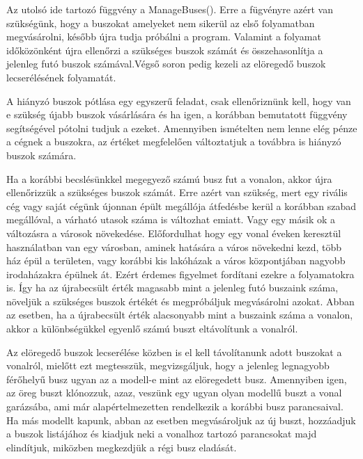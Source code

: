 Az utolsó ide tartozó függvény a ManageBuses(). Erre a fügvényre azért van szükségünk, hogy a buszokat amelyeket nem sikerül az első folyamatban megvásárolni, később újra tudja próbálni a program. Valamint a folyamat időközönként újra ellenőrzi a szükséges buszok számát és összehasonlítja a jelenleg futó buszok számával.Végső soron pedig kezeli az elöregedő buszok lecserélésének folyamatát.

A hiányzó buszok pótlása egy egyszerű feladat, csak ellenőriznünk kell, hogy van e szükség újabb buszok vásárlására és ha igen, a korábban bemutatott függvény segítségével pótolni tudjuk a ezeket. Amennyiben ismételten nem lenne elég pénze a cégnek a buszokra, az értéket megfelelően változtatjuk a továbbra is hiányzó buszok számára.

Ha a korábbi becslésünkkel megegyező számú busz fut a vonalon, akkor újra ellenőrizzük a szükséges buszok számát. Erre azért van szükség, mert egy rivális cég vagy saját cégünk újonnan épült megállója átfedésbe kerül a korábban szabad megállóval, a várható utasok száma is változhat emiatt. Vagy egy másik ok a változásra a városok növekedése. Előfordulhat hogy egy vonal éveken keresztül használatban van egy városban, aminek hatására a város növekedni kezd, több ház épül a területen, vagy korábbi kis lakóházak a város központjában nagyobb irodaházakra épülnek át. Ezért érdemes figyelmet fordítani ezekre a folyamatokra is. Így ha az újrabecsült érték magasabb mint a jelenleg futó buszaink száma, növeljük a szükséges buszok értékét és megpróbáljuk megvásárolni azokat. Abban az esetben, ha a újrabecsült érték alacsonyabb mint a buszaink száma a vonalon, akkor a különbségükkel egyenlő számú buszt eltávolítunk a vonalról.

Az elöregedő buszok lecserélése közben is el kell távolítanunk adott buszokat a vonalról, mielőtt ezt megtesszük, megvizsgáljuk, hogy a jelenleg legnagyobb férőhelyű busz ugyan az a modell-e mint az elöregedett busz. Amennyiben igen, az öreg buszt klónozzuk, azaz, veszünk egy ugyan olyan modellű buszt a vonal garázsába, ami már alapértelmezetten rendelkezik a korábbi busz parancsaival. Ha más modellt kapunk, abban az esetben megvásároljuk az új buszt, hozzáadjuk a buszok listájához és kiadjuk neki a vonalhoz tartozó parancsokat majd elindítjuk, miközben megkezdjük a régi busz eladását.

